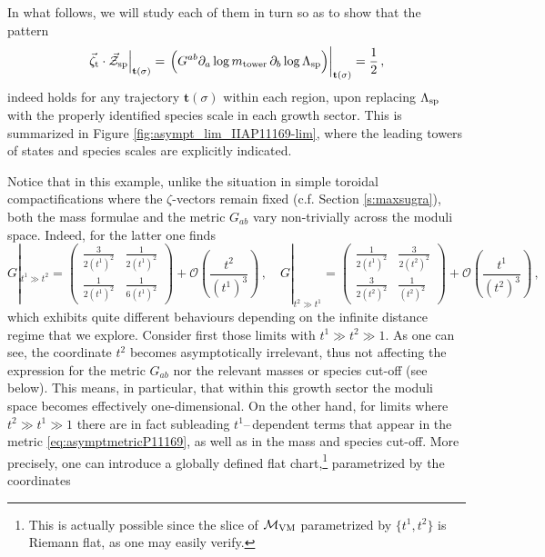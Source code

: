 In what follows, we will study each of them in turn so as to show that the pattern
%
\begin{equation} \label{eq:patternP11169}
	\left.\vec{\zeta}_{\text{t}}\cdot\vec{\mathcal{Z}}_{\rm sp}\right|_{\mathbf{t}(\sigma)}=\left.\left(G^{a b}\partial_{a}\log m_{\text{tower}}\,\partial_{b}\log \Lambda_{\rm sp}\right)\right|_{\mathbf{t}(\sigma)} = \frac{1}{2}\, ,
\end{equation}
%
indeed holds for any trajectory $\mathbf{t}(\sigma)$ within each region, upon replacing $\Lambda_{\text{sp}}$ with the properly identified species scale in each growth sector. This is summarized in Figure \ref{fig:asympt_lim_IIAP11169-lim}, where the leading towers of states and species scales are explicitly indicated.
	
Notice that in this example, unlike the situation in simple toroidal compactifications where the $\zeta$-vectors remain fixed (c.f. Section \ref{s:maxsugra}), both the mass formulae and the metric $G_{a b}$ vary non-trivially across the moduli space. Indeed, for the latter one finds
%
\begin{equation}\label{eq:asymptmetricP11169}
	G|_{t^1\gg t^2}=
	\begin{pmatrix}
		\frac{3}{2(t^1)^2}& \frac{1}{2(t^1)^2}\\
		\frac{1}{2(t^1)^2}&\frac{1}{6(t^1)^2}
	\end{pmatrix}
	+\mathcal{O}\left(\frac{t^2}{(t^1)^3}\right)\,,\quad
	G|_{t^2\gg t^1}=
	\begin{pmatrix}
		\frac{1}{2(t^1)^2}& \frac{3}{2(t^2)^2}\\
		\frac{3}{2(t^2)^2}&\frac{1}{(t^2)^2}
	\end{pmatrix}+\mathcal{O}\left(\frac{t^1}{(t^2)^3}\right)\, ,
\end{equation}
%
which exhibits quite different behaviours depending on the infinite distance regime that we explore. Consider first those limits with $t^1\gg t^2 \gg 1$. As one can see, the coordinate $t^2$ becomes asymptotically irrelevant, thus not affecting the expression for the metric $G_{a b}$ nor the relevant masses or species cut-off (see below). This means, in particular, that within this growth sector the moduli space becomes effectively one-dimensional. On the other hand, for limits where $t^2\gg t^1\gg 1$ there are in fact subleading $t^1$--\,dependent terms that appear in the metric \eqref{eq:asymptmetricP11169}, as well as in the mass and species cut-off. More precisely, one can introduce a globally defined flat chart,\footnote{This is actually possible since the slice of $\mathcal{M}_{\rm VM}$ parametrized by $\{t^1,t^2\}$ is Riemann flat, as one may easily verify.} parametrized by the coordinates
